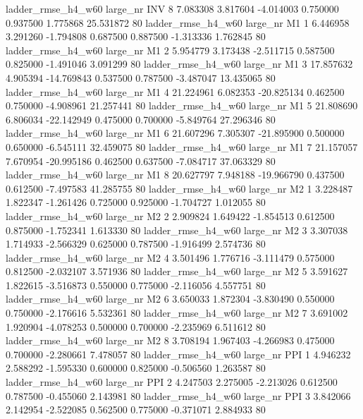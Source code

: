  ladder_rmse_h4_w60   large_nr      INV                 8  7.083308  3.817604  -4.014003 0.750000 0.937500  1.775868   25.531872 80
 ladder_rmse_h4_w60   large_nr       M1                 1  6.446958  3.291260  -1.794808 0.687500 0.887500 -1.313336    1.762845 80
 ladder_rmse_h4_w60   large_nr       M1                 2  5.954779  3.173438  -2.511715 0.587500 0.825000 -1.491046    3.091299 80
 ladder_rmse_h4_w60   large_nr       M1                 3 17.857632  4.905394 -14.769843 0.537500 0.787500 -3.487047   13.435065 80
 ladder_rmse_h4_w60   large_nr       M1                 4 21.224961  6.082353 -20.825134 0.462500 0.750000 -4.908961   21.257441 80
 ladder_rmse_h4_w60   large_nr       M1                 5 21.808690  6.806034 -22.142949 0.475000 0.700000 -5.849764   27.296346 80
 ladder_rmse_h4_w60   large_nr       M1                 6 21.607296  7.305307 -21.895900 0.500000 0.650000 -6.545111   32.459075 80
 ladder_rmse_h4_w60   large_nr       M1                 7 21.157057  7.670954 -20.995186 0.462500 0.637500 -7.084717   37.063329 80
 ladder_rmse_h4_w60   large_nr       M1                 8 20.627797  7.948188 -19.966790 0.437500 0.612500 -7.497583   41.285755 80
 ladder_rmse_h4_w60   large_nr       M2                 1  3.228487  1.822347  -1.261426 0.725000 0.925000 -1.704727    1.012055 80
 ladder_rmse_h4_w60   large_nr       M2                 2  2.909824  1.649422  -1.854513 0.612500 0.875000 -1.752341    1.613330 80
 ladder_rmse_h4_w60   large_nr       M2                 3  3.307038  1.714933  -2.566329 0.625000 0.787500 -1.916499    2.574736 80
 ladder_rmse_h4_w60   large_nr       M2                 4  3.501496  1.776716  -3.111479 0.575000 0.812500 -2.032107    3.571936 80
 ladder_rmse_h4_w60   large_nr       M2                 5  3.591627  1.822615  -3.516873 0.550000 0.775000 -2.116056    4.557751 80
 ladder_rmse_h4_w60   large_nr       M2                 6  3.650033  1.872304  -3.830490 0.550000 0.750000 -2.176616    5.532361 80
 ladder_rmse_h4_w60   large_nr       M2                 7  3.691002  1.920904  -4.078253 0.500000 0.700000 -2.235969    6.511612 80
 ladder_rmse_h4_w60   large_nr       M2                 8  3.708194  1.967403  -4.266983 0.475000 0.700000 -2.280661    7.478057 80
 ladder_rmse_h4_w60   large_nr      PPI                 1  4.946232  2.588292  -1.595330 0.600000 0.825000 -0.506560    1.263587 80
 ladder_rmse_h4_w60   large_nr      PPI                 2  4.247503  2.275005  -2.213026 0.612500 0.787500 -0.455060    2.143981 80
 ladder_rmse_h4_w60   large_nr      PPI                 3  3.842066  2.142954  -2.522085 0.562500 0.775000 -0.371071    2.884933 80
